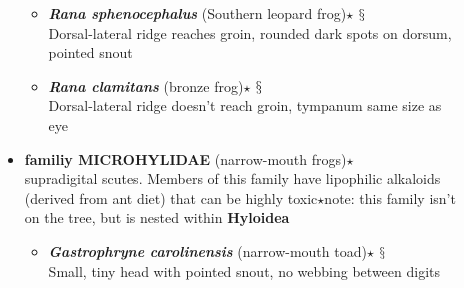 \documentclass[a4paper,12pt]{article}
\begin{document}
\begin{description}
\begin{itemize}
\begin{itemize}
    \item{\textbf{\textit{Rana sphenocephalus}} (Southern leopard frog)$\star$ $\mathsection$} \\ Dorsal-lateral ridge reaches groin, rounded dark spots on dorsum, pointed snout
    \item{\textbf{\textit{Rana clamitans}} (bronze frog)$\star$ $\mathsection$} \\ Dorsal-lateral ridge doesn't reach groin, tympanum same size as eye
  \end{itemize}
  \item{\textbf{familiy MICROHYLIDAE} (narrow-mouth frogs)$\star$} \\ supradigital scutes. Members of this family have lipophilic alkaloids (derived from ant diet) that can be highly toxic$\star$note: this family isn't on the tree, but is nested within \textbf{Hyloidea}
  \begin{itemize}
    \item{\textbf{\textit{Gastrophryne carolinensis}} (narrow-mouth toad)$\star$ $\mathsection$} \\ Small, tiny head with pointed snout, no webbing between digits
  \end{itemize}\end{itemize}
\end{description}
\end{document}
